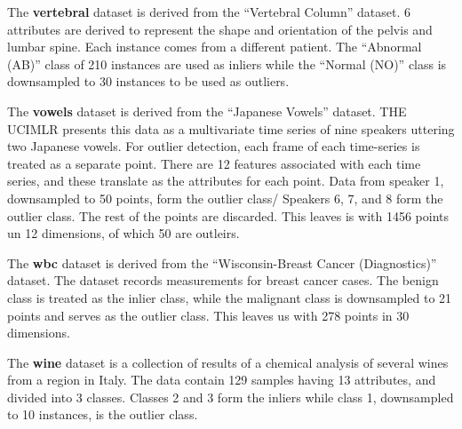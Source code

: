 The \textbf{vertebral} dataset is derived from the ``Vertebral Column'' dataset.
6 attributes are derived to represent the shape and orientation of the pelvis and lumbar spine.
Each instance comes from a different patient.
The ``Abnormal (AB)'' class of 210 instances are used as inliers while the ``Normal (NO)'' class is downsampled to 30 instances to be used as outliers.

The \textbf{vowels} dataset is derived from the ``Japanese Vowels'' dataset.
THE UCIMLR presents this data as a multivariate time series of nine speakers uttering two Japanese vowels.
For outlier detection, each frame of each time-series is treated as a separate point.
There are 12 features associated with each time series, and these translate as the attributes for each point.
Data from speaker 1, downsampled to 50 points, form the outlier class/
Speakers 6, 7, and 8 form the outlier class.
The rest of the points are discarded.
This leaves is with 1456 points un 12 dimensions, of which 50 are outleirs.

The \textbf{wbc} dataset is derived from the ``Wisconsin-Breast Cancer (Diagnostics)'' dataset.
The dataset records measurements for breast cancer cases.
The benign class is treated as the inlier class, while the malignant class is downsampled to 21 points and serves as the outlier class.
This leaves us with 278 points in 30 dimensions.

The \textbf{wine} dataset is a collection of results of a chemical analysis of several wines from a region in Italy.
The data contain 129 samples having 13 attributes, and divided into 3 classes.
Classes 2 and 3 form the inliers while class 1, downsampled to 10 instances, is the outlier class.
